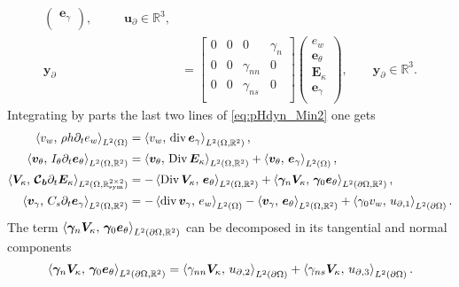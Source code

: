 \begin{subequations}
\begin{align}
\begin{pmatrix}
	\bm{e}_{\gamma} \\
	\end{pmatrix}, \qquad\;\; \bm{u}_\partial \in \mathbb{R}^3, \\
	\bm{y}_\partial &= 
	\begin{bmatrix}
	{0} &  {0} & {0} & \gamma_{n} \\
	{0} &  {0} & \gamma_{nn} & {0} \\
	{0} &  {0} & \gamma_{ns} & {0} \\
	\end{bmatrix}
	\begin{pmatrix}
	e_w \\
	\bm{e}_{\theta} \\
	\bm{E}_{\kappa} \\
	\bm{e}_{\gamma} \\
	\end{pmatrix}, \qquad \bm{y}_\partial \in \mathbb{R}^3.
	\end{align}
\end{subequations}
Integrating by parts the last two lines of \eqref{eq:pHdyn_Min2} one gets 
\begin{equation}
\begin{aligned}
\inner[L^2(\Omega)]{v_w}{\rho h \partial_t e_w} &= \inner[L^2(\Omega, \mathbb{R}^{2})]{v_w}{\div \bm{e}_\gamma}, \\
\inner[L^2(\Omega, \mathbb{R}^{2})]{\bm{v}_\theta}{I_\theta \partial_t \bm{e}_\theta} &= \inner[L^2(\Omega, \mathbb{R}^{2})]{\bm{v}_\theta}{\Div \bm{E}_\kappa} + \inner[L^2(\Omega)]{\bm{v}_\theta}{\bm{e}_\gamma} , \\
\inner[L^2(\Omega, \mathbb{R}^{2\times 2}_{\text{sym}})]{\bm{V}_\kappa}{\bm{\mathcal{C}_b} \partial_t \bm{E}_\kappa} &= -\inner[L^2(\Omega, \mathbb{R}^{2})]{\Div \bm{V}_\kappa}{\bm{e}_\theta} + \inner[L^2(\partial\Omega, \mathbb{R}^2)]{\bm\gamma_n \bm{V}_\kappa}{\bm\gamma_0 \bm{e}_{\theta}}, \\
\inner[L^2(\Omega, \mathbb{R}^{2})]{\bm{v}_\gamma}{C_s \partial_t \bm{e}_\gamma} &= -\inner[L^2(\Omega)]{\div \bm{v}_\gamma}{e_w} - \inner[L^2(\Omega, \mathbb{R}^{2})]{\bm{v}_\gamma}{\bm{e}_\theta}  + \inner[L^2(\partial\Omega)]{\gamma_0 v_w}{{u}_{\partial, 1}}. \\
\end{aligned}
\end{equation}
The term $\inner[L^2(\partial\Omega, \mathbb{R}^2)]{\bm\gamma_n \bm{V}_\kappa}{\bm\gamma_0 \bm{e}_{\theta}}$ can be decomposed in its tangential and normal components
\begin{equation}
\inner[L^2(\partial\Omega, \mathbb{R}^2)]{\bm\gamma_n \bm{V}_\kappa}{\bm\gamma_0 \bm{e}_{\theta}} = \inner[L^2(\partial\Omega)]{\gamma_{nn} \bm{V}_\kappa}{{u}_{\partial,2}} + \inner[L^2(\partial\Omega)]{\gamma_{ns} \bm{V}_\kappa}{{u}_{\partial,3}}.
\end{equation}
